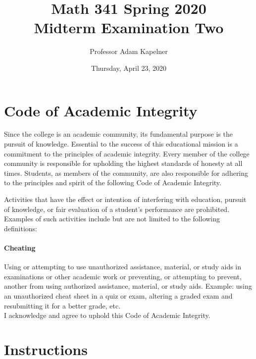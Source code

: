 \documentclass[12pt]{article}
\title{Math 341 Spring 2020 \\ Midterm Examination Two}
\author{Professor Adam Kapelner}
\date{Thursday, April 23, 2020}
\begin{document}
\maketitle


\thispagestyle{empty}

\section*{Code of Academic Integrity}

\footnotesize
Since the college is an academic community, its fundamental purpose is the pursuit of knowledge. Essential to the success of this educational mission is a commitment to the principles of academic integrity. Every member of the college community is responsible for upholding the highest standards of honesty at all times. Students, as members of the community, are also responsible for adhering to the principles and spirit of the following Code of Academic Integrity.

Activities that have the effect or intention of interfering with education, pursuit of knowledge, or fair evaluation of a student's performance are prohibited. Examples of such activities include but are not limited to the following definitions:

\paragraph{Cheating} Using or attempting to use unauthorized assistance, material, or study aids in examinations or other academic work or preventing, or attempting to prevent, another from using authorized assistance, material, or study aids. Example: using an unauthorized cheat sheet in a quiz or exam, altering a graded exam and resubmitting it for a better grade, etc.
\\

\noindent I acknowledge and agree to uphold this Code of Academic Integrity. \\


\normalsize

\section*{Instructions}
\end{document}
